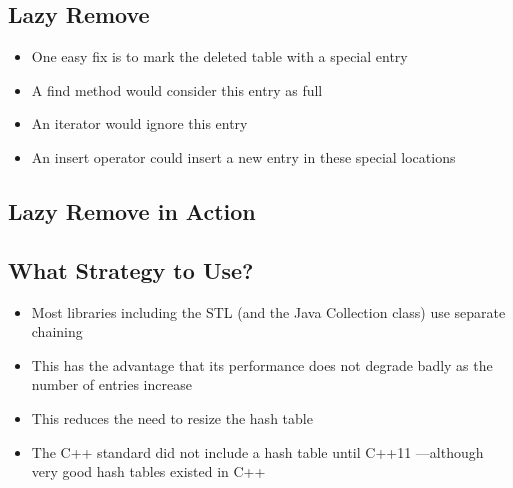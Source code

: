 \begin{slide}
\section{Lazy Remove}

\begin{PauseHighLight}
  \begin{itemize}
  \item One easy fix is to mark the deleted table with a special
    entry\pause
  \item A find method would consider this entry as full\pause
  \item An iterator would ignore this entry\pause
  \item An insert operator could insert a new entry in these special
    locations\pause
  \end{itemize}
\end{PauseHighLight}

\end{slide}


\begin{slide}
\section{Lazy Remove in Action}

\pausebuild
\begin{center}
  \pause
\end{center}
\end{slide}


\Outline %


\begin{slide}
\section{What Strategy to Use?}

\begin{PauseHighLight}
  \begin{itemize}
  \item Most libraries including the STL (and the Java Collection
    class) use separate chaining\pause
  \item This has the advantage that its performance does not degrade
    badly as the number of entries increase\pause
  \item This reduces the need to resize the hash table\pause
  \item The C++ standard did not include a hash table until C++11
    \Frowny\pause---although very good hash tables existed in C++\pause
  \end{itemize}
\end{PauseHighLight}

\end{slide}

